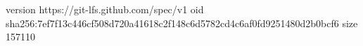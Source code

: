 version https://git-lfs.github.com/spec/v1
oid sha256:7ef7f13c446cf508d720a41618c2f148c6d5782cd4c6af0fd9251480d2b0bcf6
size 157110
